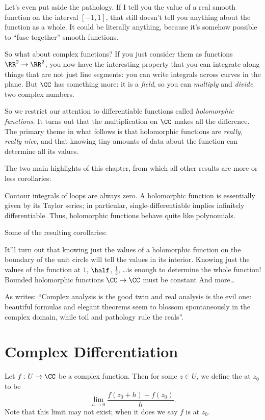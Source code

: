 Let's even put aside the pathology.
If I tell you the value of a real smooth function on the interval $[-1, 1]$,
that still doesn't tell you anything about the function as a whole.
It could be literally anything, because it's somehow possible to ``fuse together'' smooth functions.

So what about complex functions?
If you just consider them as functions $\RR^2 \to \RR^2$, you now have the interesting property
that you can integrate along things that are not just line segments: you can write integrals
across curves in the plane.
But $\CC$ has something more: it is a \emph{field}, so you can \emph{multiply} and \emph{divide} two complex numbers.

So we restrict our attention to differentiable functions called \emph{holomorphic functions}.
It turns out that the multiplication on $\CC$ makes all the difference.
The primary theme in what follows is that holomorphic functions are \emph{really, really nice},
and that knowing tiny amounts of data about the function can determine all its values.

The two main highlights of this chapter,
from which all other results are more or less corollaries:
\begin{itemize}
	\ii Contour integrals of loops are always zero.
	\ii A holomorphic function is essentially given by its Taylor series;
	in particular, single-differentiable implies infinitely differentiable.
	Thus, holomorphic functions behave quite like polynomials.
\end{itemize}
Some of the resulting corollaries:
\begin{itemize}
	\ii It'll turn out that knowing just the values of a holomorphic function on the boundary of the unit circle will tell the values in its interior.
	\ii Knowing just the values of the function at $1$, $\half$, $\frac13$, \dots is enough to determine the whole function!
	\ii Bounded holomorphic functions $\CC \to \CC$ must be constant
	\ii And more\dots
\end{itemize}

As \cite{ref:pugh} writes: ``Complex analysis is the good twin and real analysis is the evil one: beautiful formulas and elegant theorems seem to blossom spontaneously in the complex domain, while toil and pathology rule the reals''.


\section{Complex Differentiation}
Let $f : U \to \CC$ be a complex function.
Then for some $z \in U$, we define the  at $z_0$ to be
\[
	\lim_{h \to 0} \frac{f(z_0+h) - f(z_0)}{h}.
\]
Note that this limit may not exist; when it does we say $f$ is  at $z_0$.

